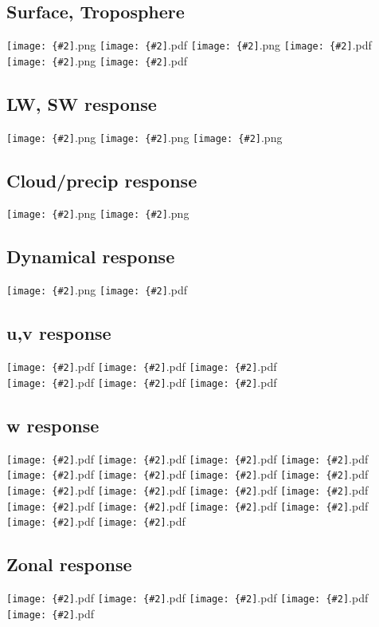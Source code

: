 \documentclass[12pt,a4paper]{article}
\newcommand{\pngfig}[2][0.5]{\texttt{[image: \{\#2]}.png}}
\newcommand{\pdffig}[2][0.5]{\texttt{[image: \{\#2]}.pdf}}
\begin{document}
\section{}
\subsection{Surface, Troposphere}
\pngfig[0.5]{comp_Tmax_sfc}
\pdffig[0.5]{comp_RHmax_1000}
\pngfig[0.5]{comp_Tmax_700}
\pdffig[0.5]{comp_RHmax_700}
\pngfig[0.5]{comp_Tmax_300}
\pdffig[0.5]{comp_RHmax_300}

\subsection{LW, SW response}

\pngfig[0.5]{comp_lwclsky_max}
\pngfig[0.5]{comp_dlwr_max}
\pngfig[0.5]{comp_dswr_max}

\subsection{Cloud/precip response}
\pngfig[0.5]{comp_cldfull_max}
\pngfig[0.5]{comp_precip_max}

\subsection{Dynamical response}
\pngfig[0.5]{comp_Pmax_sfc}
\pdffig[0.5]{comp_GPHTmax_500}

\pagebreak
\subsection{u,v  response}
\pdffig[0.5]{u_lowtrop_max}
\pdffig[0.5]{u_midtrop_max}
\pdffig[0.5]{u_uptrop_max}\\
\noindent\pdffig[0.5]{v_lowtrop_max}
\pdffig[0.5]{v_midtrop_max}
\pdffig[0.5]{v_uptrop_max}

\subsection{w response}
\noindent\pdffig[0.5]{w_lat2.5}
\pdffig[0.5]{w_lat-2.5}
\pdffig[0.5]{w_lat7.5}
\pdffig[0.5]{w_lat-7.5}
\pdffig[0.5]{w_lat12.5}
\pdffig[0.5]{w_lat-12.5}
\pdffig[0.5]{w_lat17.5}
\pdffig[0.5]{w_lat-17.5}
\pdffig[0.5]{w_lat22.5}
\pdffig[0.5]{w_lat-22.5}
\pdffig[0.5]{w_lat27.5}
\pdffig[0.5]{w_lat-27.5}
\pdffig[0.5]{w_lat32.5}
\pdffig[0.5]{w_lat-32.5}
\pdffig[0.5]{w_lat37.5}
\pdffig[0.5]{w_lat-37.5}
\pdffig[0.5]{w_lat42.5}
\pdffig[0.5]{w_lat-42.5}

\subsection{Zonal response}
\pdffig[1.0]{zon_temp}
\pdffig[1.0]{zon_rh}
\pdffig[1.0]{zon_rad}
\pdffig[1.0]{zon_cldprc}
\pdffig[1.0]{zon_flux}
\end{document}
